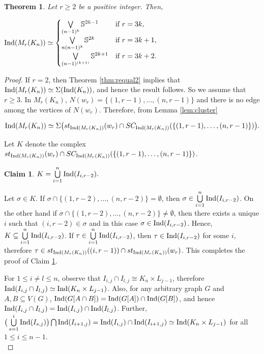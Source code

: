 \documentclass[12pt]{article}
\newtheorem{thm}{Theorem}
\numberwithin{thm}{section}
\newtheorem{claim}{Claim}
\theoremstyle{definition}
\newcommand{\bS}{\mathbb{S}}
\newcommand{\ind}{{\rm{Ind}}}
\begin{document}
 \begin{thm} \label{thm:mycielskian} Let $r \geq 2$ be a positive integer. Then,
	
	\begin{center}
		$ \ind(M_r(K_n)) \simeq 
		\begin{cases}
		\bigvee\limits_{(n-1)^k} \bS^{2k-1} & \text{if } r=3k, \\
		\bigvee\limits_{n(n-1)^k} \bS^{2k} & \text{if } r=3k+1, \\
		\bigvee\limits_{(n-1)^{(k+1)}} \bS^{2k+1} & \text{if } r= 3k+2. \\
		\end{cases}$
	\end{center}
\end{thm}
\begin{proof}
	
	If $r =2$, then  Theorem \ref{thm:requal2} implies that $\ind(M_r(K_n)) \simeq \Sigma (\ind(K_n))$, and hence the result follows. So we  assume that  $r \geq 3$.  
	In $M_r(K_n)$, $N(w_r) = \{(1, r-1), \ldots, (n, r-1)\}$ and there is no edge among the vertices of $N(w_r)$. Therefore, from Lemma \ref{lem:cluster} 
	
	\begin{align}\label{eqn:cluster}
	\ind(M_r(K_n)) \simeq \Sigma \big( st_{\ind(M_r(K_n))}(w_r) \cap SC_{\ind(M_r(K_n))}(\{(1,r-1), \ldots, (n, r-1)\})\big).
\end{align}

\noindent	Let $K$ denote the complex $ st_{\ind(M_r(K_n))}(w_r) \cap SC_{\ind(M_r(K_n))}(\{(1,r-1), \ldots, (n, r-1)\})$.

	\begin{claim}\label{claim:setK}
		$K = \bigcup\limits_{i=1}^{n}\emph{\ind}(I_{i,r-2}).$
	\end{claim}
		Let $\sigma \in K$. If $\sigma \cap \{(1, r-2), \ldots, (n, r-2)\} = \emptyset$, then $\sigma \in \bigcup\limits_{i=1}^{n}\ind(I_{i,r-2})$. On the other hand  if $ \sigma \cap \{(1, r-2), \ldots, (n, r-2)\} \neq \emptyset$, then there exists a unique $i$ such that $(i, r-2) \in \sigma$ and in this case $\sigma \in \ind(I_{i, r-2})$. Hence, $K \subseteq \bigcup\limits_{i=1}^{n}\ind(I_{i,r-2})$. If $\tau \in \bigcup\limits_{i=1}^{n}\ind(I_{i,r-2})$, then $\tau \in \ind(I_{i, r-2})$ for some $i$, therefore  $\tau \in st_{\ind(M_r(K_n))}((i, r-1)) \cap st_{\ind(M_r(K_n))}(w_r)$. This completes the proof of Claim \ref{claim:setK}.
	
    	For $ 1\leq i\neq l \leq n$, observe that $I_{i,j} \cap I_{l,j} \cong K_n \times L_{j-1}$, therefore $\ind(I_{i,j} \cap I_{l,j}) \simeq \ind(K_n \times L_{j-1})$. Also, for any arbitrary graph $G$ and $A,B \subseteq V(G)$, $\ind(G[A\cap B]) = \ind(G[A]) \cap \ind(G[B])$, and hence   $\ind(I_{i,j} \cap I_{l, j}) =  \ind(I_{i,j}) \cap \ind(I_{l, j})$. Further, $\big(\bigcup\limits_{s= 1}^{i} \ind(I_{s, j})\big) \bigcap \ind(I_{i+1, j}) = \ind(I_{i, j})\cap \ind(I_{i+1,j})\simeq \ind(K_n \times L_{j-1})$ for all $1 \leq i \leq n-1$.\\


\end{proof}
\end{document}
